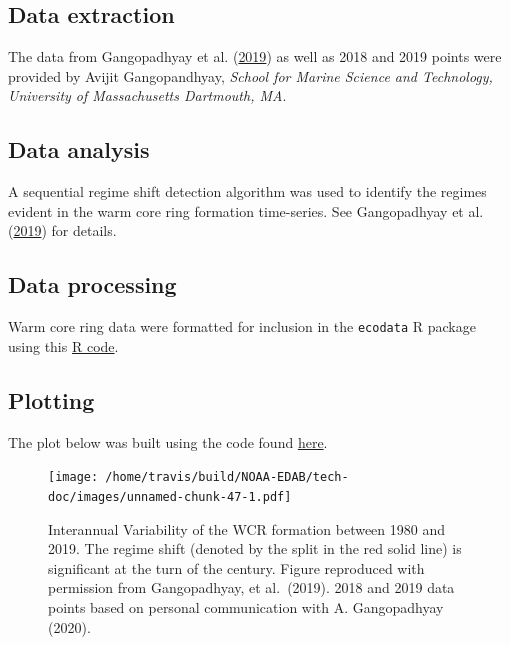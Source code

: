 \documentclass[
]{book}
\begin{document}
\hypertarget{data-extraction-34}{%
\subsection{Data extraction}\label{data-extraction-34}}

The data from Gangopadhyay et al. (\protect\hyperlink{ref-gangopadhyay2019}{2019}) as well as 2018 and 2019 points were provided by Avijit Gangopandhyay, \emph{School for Marine Science and Technology, University of Massachusetts Dartmouth, MA}.

\hypertarget{data-analysis-42}{%
\subsection{Data analysis}\label{data-analysis-42}}

A sequential regime shift detection algorithm was used to identify the regimes evident in the warm core ring formation time-series. See Gangopadhyay et al. (\protect\hyperlink{ref-gangopadhyay2019}{2019}) for details.

\hypertarget{data-processing-29}{%
\subsection{Data processing}\label{data-processing-29}}

Warm core ring data were formatted for inclusion in the \texttt{ecodata} R package using this \href{https://github.com/NOAA-EDAB/ecodata/blob/master/data-raw/get_warm_core_rings.R}{R code}.

\hypertarget{plotting-35}{%
\subsection{Plotting}\label{plotting-35}}

The plot below was built using the code found
\href{https://github.com/NOAA-EDAB/ecodata/blob/master/chunk-scripts/LTL.Rmd-warm-core-rings.R}{here}.

\begin{figure}
\centering
\texttt{[image: /home/travis/build/NOAA-EDAB/tech-doc/images/unnamed-chunk-47-1.pdf]}
\caption{\label{fig:unnamed-chunk-47} Interannual Variability of the WCR formation between 1980 and 2019. The regime shift (denoted by the split in the red solid line) is significant at the turn of the century. Figure reproduced with permission from Gangopadhyay, et al.~(2019). 2018 and 2019 data points based on personal communication with A. Gangopadhyay (2020).}
\end{figure}
\end{document}
